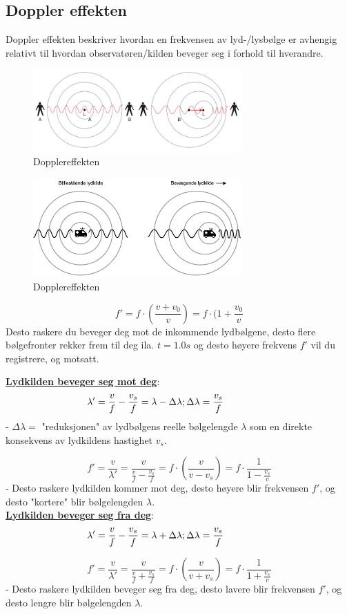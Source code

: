 \documentclass[12pt]{article}
\begin{document}
\subsection{Doppler effekten}
Doppler effekten beskriver hvordan en frekvensen av lyd-/lysbølge er avhengig relativt til hvordan observatøren/kilden beveger seg i forhold til hverandre. 
\begin{figure} [H]
    \centering
    \includegraphics[width = 8cm]{images/doppler.png}
    \caption{Dopplereffekten}
\end{figure}
\begin{figure} [H]
    \centering
    \includegraphics[width = 8cm]{images/doppler2.png}
    \caption{Dopplereffekten}
\end{figure}
$$f' = f\cdot (\frac{v+v_0}{v}) = f\cdot (1+\frac{v_0}{v}$$
Desto raskere du beveger deg mot de inkommende lydbølgene, desto flere bølgefronter rekker frem til deg ila. $t=1.0s$ og desto høyere frekvens $f'$ vil du registrere, og motsatt.

\underline{\textbf{Lydkilden beveger seg mot deg}}:
$$\lambda' = \frac{v}{f}-\frac{v_s}{f} = \lambda-\Delta\lambda; \hspace{5em \Delta\lambda = \frac{v_s}{f}}$$
- $\Delta \lambda =$ "reduksjonen" av lydbølgens reelle bølgelengde $\lambda$ som en direkte konsekvens av lydkildens hastighet $v_s$.

$$f' = \frac{v}{\lambda'} = \frac{v}{\frac{v}{f}-\frac{v_s}{f}} = f\cdot (\frac{v}{v-v_s}) = f\cdot \frac{1}{1-\frac{v_s}{v}}$$
- Desto raskere lydkilden kommer mot deg, desto høyere blir frekvensen $f'$, og desto "kortere" blir bølgelengden $\lambda$.\\
\bigskip
\bigskip
\underline{\textbf{Lydkilden beveger seg fra deg}}:
$$\lambda' = \frac{v}{f}-\frac{v_s}{f} = \lambda +\Delta\lambda; \hspace{5em \Delta\lambda = \frac{v_s}{f}}$$

$$f' = \frac{v}{\lambda'} = \frac{v}{\frac{v}{f}+\frac{v_s}{f}} = f\cdot (\frac{v}{v+v_s}) = f\cdot \frac{1}{1+\frac{v_s}{v}}$$
- Desto raskere lydkilden beveger seg fra deg, desto lavere blir frekvensen $f'$, og desto lengre blir bølgelengden $\lambda$.
\end{document}
